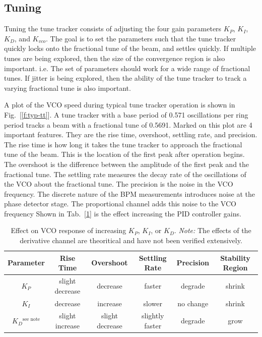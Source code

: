 \subsection{Tuning \label{Tuning}} Tuning the tune tracker consists of
adjusting the four gain parameters $K_P$, $K_I$, $K_D$, and $K_{vco}$.
The goal is to set the parameters such that the tune tracker quickly
locks onto the fractional tune of the beam, and settles quickly.  If
multiple tunes are being explored, then the size of the convergence
region is also important.  i.e.  The set of parameters should work for
a wide range of fractional tunes.  If jitter is being explored, then
the ability of the tune tracker to track a varying fractional tune is
also important.

A plot of the VCO speed during typical tune tracker operation is shown
in Fig.~[\ref{f:typ-tt}].  A tune tracker with a base period of 0.571
oscillations per ring period tracks a beam with a fractional tune of
0.5691.  Marked on this plot are 4 important features.  They are the
rise time, overshoot, settling rate, and precision.  The rise time is
how long it takes the tune tracker to approach the fractional tune of
the beam.  This is the location of the first peak after operation
begins.  The overshoot is the difference between the amplitude of the
first peak and the fractional tune.  The settling rate measures the
decay rate of the oscillations of the VCO about the fractional tune.
The precision is the noise in the VCO frequency.  The discrete nature
of the BPM measurements introduces noise at the phase detector stage.
The proportional channel adds this noise to the VCO frequency Shown in
Tab.~[\ref{t:pid-params}] is the effect increasing the PID controller
gains.

\begin{table}
\begin{tabular}{|c|ccccc|}
\hline
Parameter&  Rise Time&        Overshoot&        Settling Rate&      Precision&  Stability Region\\
\hline
$K_P$&      slight decrease&  decrease&         faster&             degrade&    shrink\\
$K_I$&      decrease&         increase&         slower&             no change&  shrink\\
$K_D$$^\textrm{see note}$&    slight increase&  slight decrease&  slightly faster&    degrade&    grow\\ 
\hline
\end{tabular}
\caption[Effect on VCO response of increasing $K_P$, $K_I$, or $K_D$.]{
Effect on VCO response of increasing $K_P$, $K_I$, or $K_D$. 
{\it Note:} The effects of the derivative channel are theoritical and have not 
been verified extensively.}
\label{t:pid-params}
\end{table}

